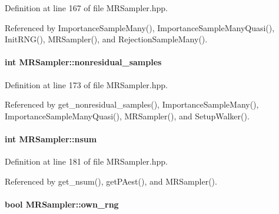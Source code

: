 \-Definition at line 167 of file \-M\-R\-Sampler.\-hpp.



\-Referenced by \-Importance\-Sample\-Many(), \-Importance\-Sample\-Many\-Quasi(), \-Init\-R\-N\-G(), \-M\-R\-Sampler(), and \-Rejection\-Sample\-Many().

\hypertarget{classMRSampler_a31a44287b73bf986bbddcf67245d3c9c}{
\paragraph[{nonresidual\-\_\-samples}]{\setlength{\rightskip}{0pt plus 5cm}int {\bf \-M\-R\-Sampler\-::nonresidual\-\_\-samples}}}\label{classMRSampler_a31a44287b73bf986bbddcf67245d3c9c}


\-Definition at line 173 of file \-M\-R\-Sampler.\-hpp.



\-Referenced by get\-\_\-nonresidual\-\_\-samples(), \-Importance\-Sample\-Many(), \-Importance\-Sample\-Many\-Quasi(), \-M\-R\-Sampler(), and \-Setup\-Walker().

\hypertarget{classMRSampler_ab82586caa232037dde75eba134f035ae}{
\paragraph[{nsum}]{\setlength{\rightskip}{0pt plus 5cm}int {\bf \-M\-R\-Sampler\-::nsum}}}\label{classMRSampler_ab82586caa232037dde75eba134f035ae}


\-Definition at line 181 of file \-M\-R\-Sampler.\-hpp.



\-Referenced by get\-\_\-nsum(), get\-P\-Aest(), and \-M\-R\-Sampler().

\hypertarget{classMRSampler_aa3abc2865eb1f5eed99f3b4017621d04}{
\paragraph[{own\-\_\-rng}]{\setlength{\rightskip}{0pt plus 5cm}bool {\bf \-M\-R\-Sampler\-::own\-\_\-rng}}}\label{classMRSampler_aa3abc2865eb1f5eed99f3b4017621d04}


